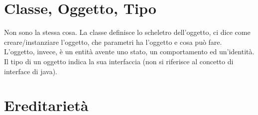 \documentclass{article}
\begin{document}
\section*{Classe, Oggetto, Tipo}

Non sono la stessa cosa.
La classe definisce lo scheletro dell'oggetto, ci dice come creare/instanziare l'oggetto, che parametri ha l'oggetto e cosa può fare.\\
L'oggetto, invece, è un entità avente uno stato, un comportamento ed un'identità.\\
Il tipo di un oggetto indica la sua interfaccia (non si riferisce al concetto di interface di java).

\section*{Ereditarietà}
\end{document}
